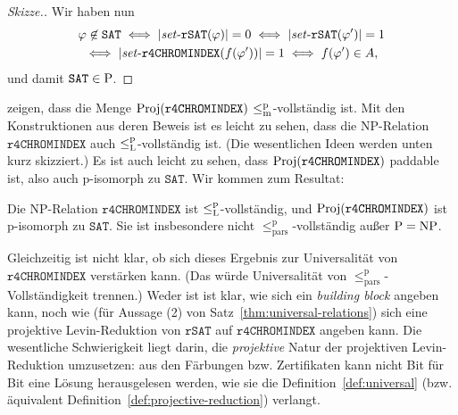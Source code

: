 \begin{proof}[Skizze.]
    Wir haben nun
    \begin{gather*} \phi\not\in\mathtt{SAT} \iff |\fset{}\mathtt{rSAT}(\phi)|=0 \iff |\fset{}\mathtt{rSAT}(\phi')|=1 \\ \iff |\fset{}\mathtt{r4CHROMINDEX}(f(\phi'))|=1 \iff f(\phi') \in A, \end{gather*}
    und damit $\mathtt{SAT}\in\P$.
\end{proof}

\textcite{leven_np_1983} zeigen, dass die Menge $\Proj(\mathtt{r4CHROMINDEX})$ $\leqmp$-vollständig ist. 
Mit den Konstruktionen aus deren Beweis ist es leicht zu sehen, dass die NP-Relation $\mathtt{r4CHROMINDEX}$ auch $\leqlp$-vollständig ist. (Die wesentlichen Ideen werden unten kurz skizziert.)
Es ist auch leicht zu sehen, dass $\Proj(\mathtt{r4CHROMINDEX})$ paddable ist, also  auch p-isomorph zu $\mathtt{SAT}$.
Wir kommen zum Resultat:
\begin{observation}
    Die NP-Relation $\mathtt{r4CHROMINDEX}$ ist $\leqlp$-vollständig, und $\Proj(\mathtt{r4CHROMINDEX})$ ist p-isomorph zu $\mathtt{SAT}$.
    Sie ist insbesondere nicht $\leq_\mathrm{pars}^\mathrm p$-vollständig außer $\P=\NP$.
\end{observation}

Gleichzeitig ist nicht klar, ob sich dieses Ergebnis zur Universalität von $\mathtt{r4CHROMINDEX}$ verstärken kann. (Das würde Universalität von $\leq_\mathrm{pars}^\mathrm p$-Vollständigkeit trennen.) Weder ist ist klar, wie sich ein \emph{building block} angeben kann, noch wie (für Aussage (2) von Satz~\ref{thm:universal-relations}) sich eine projektive Levin-Reduktion von $\mathtt{rSAT}$ auf $\mathtt{r4CHROMINDEX}$ angeben kann. Die wesentliche Schwierigkeit liegt darin, die \emph{projektive} Natur der projektiven Levin-Reduktion umzusetzen: aus den Färbungen bzw. Zertifikaten kann nicht Bit für Bit eine Lösung herausgelesen werden, wie sie die Definition~\ref{def:universal} (bzw. äquivalent Definition~\ref{def:projective-reduction}) verlangt.

